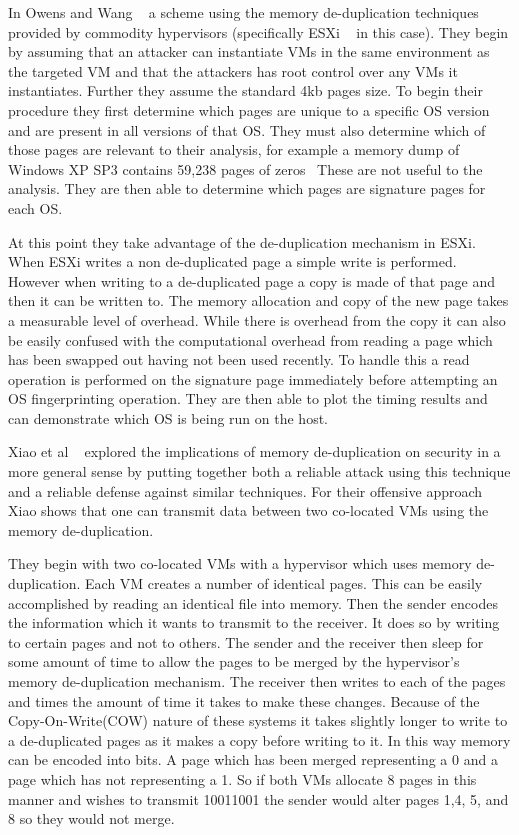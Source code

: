 In Owens and Wang ~\cite{owens_non-interactive_2011} a scheme using the memory de-duplication techniques provided by commodity hypervisors (specifically ESXi ~\cite{chaubal_architecture_2008} in this case). They begin by assuming that an attacker can instantiate VMs in the same environment as the targeted VM and that the attackers has root control over any VMs it instantiates. Further they assume the standard 4kb pages size. To begin their procedure they first determine which pages are unique to a specific OS version and are present in all versions of that OS. They must also determine which of those pages are relevant to their analysis, for example a memory dump of Windows XP SP3 contains 59,238 pages of zeros~\cite{owens_non-interactive_2011} These are not useful to the analysis. They are then able to determine which pages are signature pages for each OS. 

At this point they take advantage of the de-duplication mechanism in ESXi. When ESXi writes a non de-duplicated page a simple write is performed. However when writing to a de-duplicated page a copy is made of that page and then it can be written to. The memory allocation and copy of the new page takes a measurable level of overhead. While there is overhead from the copy it can also be easily confused with the computational overhead from reading a page which has been swapped out having not been used recently. To handle this a read operation is performed on the signature page immediately before attempting an OS fingerprinting operation. They are then able to plot the timing results and can demonstrate which OS is being run on the host. 

Xiao et al ~\cite{xiao_security_2013} explored the implications of memory de-duplication on security in a more general sense by putting together both a reliable attack using this technique and a reliable defense against similar techniques. For their offensive approach Xiao shows that one can transmit data between two co-located VMs using the memory de-duplication. 

They begin with two co-located VMs with a hypervisor which uses memory de-duplication. Each VM creates a number of identical pages. This can be easily accomplished by reading an identical file into memory. Then the sender encodes the information which it wants to transmit to the receiver. It does so by writing to certain pages and not to others. The sender and the receiver then sleep for some amount of time to allow the pages to be merged by the hypervisor's memory de-duplication mechanism. The receiver then writes to each of the pages and times the amount of time it takes to make these changes. Because of the Copy-On-Write(COW) nature of these systems it takes slightly longer to write to a de-duplicated pages as it makes a copy before writing to it. In this way memory can be encoded into bits. A page which has been merged representing a 0 and a page which has not representing a 1. So if both VMs allocate 8 pages in this manner and wishes to transmit 10011001 the sender would alter pages 1,4, 5, and 8 so they would not merge. 

